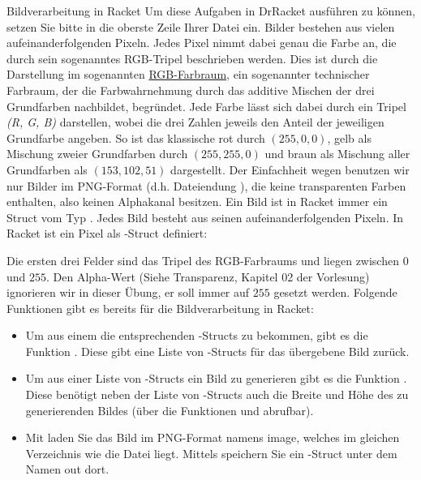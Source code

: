 \documentclass{../preamble}
\begin{document}
\begin{task}[credit = \stars{3}{3}]{Bildverarbeitung in Racket}
    Um diese Aufgaben in DrRacket ausführen zu können, setzen Sie bitte  in die oberste Zeile Ihrer Datei ein.
    \br
    Bilder bestehen aus vielen aufeinanderfolgenden Pixeln. Jedes Pixel nimmt dabei genau die Farbe an, die durch sein sogenanntes RGB-Tripel beschrieben werden. Dies ist durch die Darstellung im sogenannten \href{https://de.wikipedia.org/wiki/RGB-Farbraum}{RGB-Farbraum}, ein sogenannter technischer Farbraum, der die Farbwahrnehmung durch das additive Mischen der drei Grundfarben nachbildet, begründet. Jede Farbe lässt sich dabei durch ein Tripel \textit{(R, G, B)} darstellen, wobei die drei Zahlen jeweils den Anteil der jeweiligen Grundfarbe angeben. So ist das klassische rot durch \((255,0,0)\), gelb als Mischung zweier Grundfarben durch \((255,255,0)\) und braun als Mischung aller Grundfarben als \((153,102,51)\) dargestellt.
    \br
    Der Einfachheit wegen benutzen wir nur Bilder im PNG-Format (d.h. Dateiendung ), die keine transparenten Farben enthalten,  also keinen Alphakanal besitzen. Ein Bild ist in Racket immer ein Struct vom Typ . Jedes Bild besteht aus seinen aufeinanderfolgenden Pixeln. In Racket ist ein Pixel als -Struct definiert:
    
    Die ersten drei Felder sind das Tripel des RGB-Farbraums und liegen zwischen \(0\) und \(255\). Den Alpha-Wert (Siehe Transparenz, Kapitel 02 der Vorlesung) ignorieren wir in dieser Übung, er soll immer auf \(255\) gesetzt werden. Folgende Funktionen gibt es bereits für die Bildverarbeitung in Racket:
    \begin{itemize}
        \item Um aus einem  die entsprechenden -Structs zu bekommen, gibt es die Funktion
              \newline
              .
              \newline
              Diese gibt eine Liste von -Structs für das übergebene Bild zurück.
        \item Um aus einer Liste von -Structs ein Bild zu generieren gibt es die Funktion . Diese benötigt neben der Liste von -Structs auch die Breite und Höhe des zu generierenden Bildes (über die Funktionen  und  abrufbar).
        \item Mit  laden Sie das Bild im PNG-Format namens \grqq image\grqq , welches im gleichen Verzeichnis wie die  Datei liegt. Mittels  speichern Sie ein -Struct unter dem Namen \grqq out\grqq{} dort.

\end{itemize}
\end{task}
\end{document}
